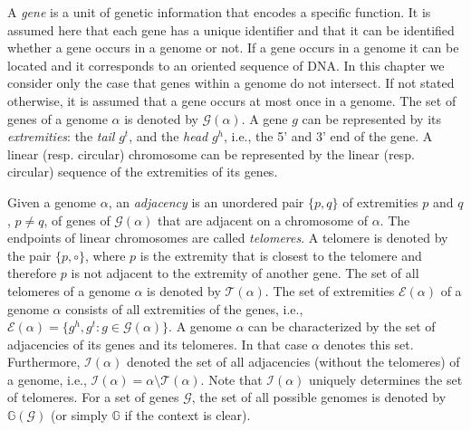\documentclass{svmult}
\begin{document}
A \emph{gene} is a unit of genetic information that encodes a specific function. It is assumed here that each
gene has a unique identifier and that it can be identified whether a gene occurs in a 
genome or not. If a gene occurs in a genome it can be located and it corresponds to an 
oriented sequence of DNA. In this chapter we consider
only the case that genes within a genome do not intersect. If not stated otherwise, it is assumed that a gene 
occurs at most once in a genome. The set of genes of a genome $\alpha$ is denoted by $\mathcal{G}(\alpha)$.
A gene $g$ can be represented by its \emph{extremities}: the \emph{tail}
$g^t$, and the \emph{head} $g^h$, i.e., the 5' and 3' end of the gene. A linear (resp. circular) 
chromosome can be represented by the linear (resp. circular) sequence of the extremities of its genes. 
%

Given a genome $\alpha$, an \emph{adjacency} is an unordered pair $\{p,q\}$ of
extremities $p$ and $q$, $p\neq q$, of genes of $\mathcal{G}(\alpha)$ that are
adjacent on a chromosome of $\alpha$. The endpoints of linear
chromosomes are called \emph{telomeres}.
A telomere is denoted by the pair $\{p,\circ\}$, where $p$ is the
extremity that is closest to the telomere and therefore $p$ is not adjacent to the extremity of another gene.
The set of all telomeres of a genome $\alpha$ is denoted by
$\mathcal{T}(\alpha)$.
The set of extremities $\mathcal{E}(\alpha)$ of a genome $\alpha$ consists of
all extremities of the genes, i.e., $\mathcal{E}(\alpha)= \{
g^h,g^t: g \in \mathcal{G}(\alpha)\}$.
A genome $\alpha$ can be characterized by the set of adjacencies of its genes 
and its telomeres. In that case $\alpha$ denotes this set.
%
Furthermore, $\mathcal{I}(\alpha)$ denoted the set of all adjacencies (without
the telomeres) of a genome, i.e.,
$\mathcal{I}(\alpha)=\alpha\setminus\mathcal{T}(\alpha)$.
Note that $\mathcal{I}(\alpha)$ uniquely determines the set of telomeres.
%
For a set of genes $\mathcal{G}$, the set of all possible genomes is denoted by $\mathbb{G}(\mathcal{G})$ (or simply 
$\mathbb{G}$ if the context is clear). 
%
\end{document}
